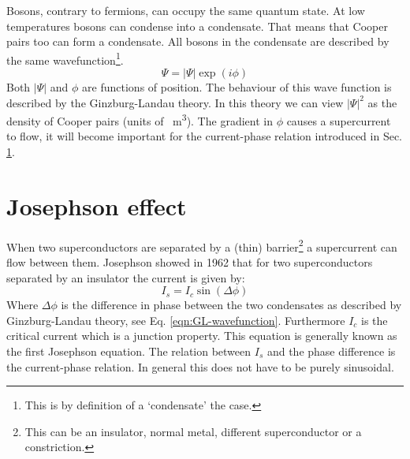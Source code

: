 Bosons, contrary to fermions, can occupy the same quantum state. At low temperatures bosons can condense into a condensate. That  means that Cooper pairs too can form a condensate. All bosons in the condensate are described by the same wavefunction\footnote{This is by definition of a `condensate' the case.}.
\begin{equation}
	\Psi = \left|\Psi\right| \exp(i\phi)
	\label{eqn:GL-wavefunction}
\end{equation}
Both $\left|\Psi\right|$ and $\phi$ are functions of position. The behaviour of this wave function is described by the Ginzburg-Landau theory. In this theory we can view $|\Psi|^2$ as the density of Cooper pairs (units of \unit{\per\cubic\meter}). The gradient in $\phi$ causes a supercurrent to flow, it will become important for the current-phase relation introduced in Sec. \ref{sec:josephson-effect}.

\section{Josephson effect}
\label{sec:josephson-effect}
When two superconductors are separated by a (thin) barrier\footnote{This can be an insulator, normal metal, different superconductor or a constriction.} a supercurrent can flow between them. Josephson showed in 1962 that for two superconductors separated by an insulator the current is given by\cite{tinkhamIntroductionSuperconductivity}:
\begin{equation}
	I_s = I_c \sin(\Delta \phi)
\end{equation}
Where $\Delta \phi$ is the difference in phase between the two condensates as described by Ginzburg-Landau theory, see Eq. \ref{eqn:GL-wavefunction}. Furthermore $I_c$ is the critical current which is a junction property. This equation is generally known as the first Josephson equation. The relation between $I_s$ and the phase difference is the current-phase relation. In general this does not have to be purely sinusoidal\cite{golubovCurrentphaseRelationJosephson2004a}.

